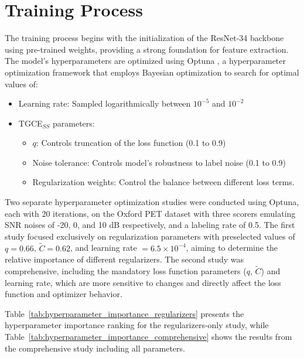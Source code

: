 \section{Training Process}

The training process begins with the initialization of the ResNet-34
backbone using pre-trained weights, providing a strong foundation for
feature extraction. The model's hyperparameters are optimized using
Optuna \cite{AkibaEtAl2019}, a hyperparameter optimization framework
that employs Bayesian
optimization to search for optimal values of:

\begin{itemize}
  \item Learning rate: Sampled logarithmically between $10^{-5}$
    and $10^{-2}$
  \item TGCE$_{SS}$ parameters:
    \begin{itemize}
      \item $q$: Controls truncation of the loss function (0.1 to 0.9)
      \item Noise tolerance: Controls model's robustness to label
        noise (0.1 to 0.9)
      \item Regularization weights: Control the balance between
        different loss terms.
    \end{itemize}
\end{itemize}

Two separate hyperparameter optimization studies were conducted using Optuna,
each with 20 iterations, on the Oxford PET dataset with three scorers
emulating SNR noises of -20, 0, and 10 dB respectively, and a labeling
rate of 0.5. The first study focused exclusively on regularization
parameters with preselected values of $q=0.66$, $\tilde{C}=0.62$, and
learning rate $=6.5 \times 10^{-4}$, aiming to determine the relative
importance of different regularizers. The second study was comprehensive,
including the mandatory loss function parameters ($q$, $\tilde{C}$) and
learning rate, which are more sensitive to changes and directly affect
the loss function and optimizer behavior.

Table~\ref{tab:hyperparameter_importance_regularizers} presents the
hyperparameter importance ranking for the regularizers-only study, while
Table~\ref{tab:hyperparameter_importance_comprehensive} shows the
results from the comprehensive study including all parameters.


